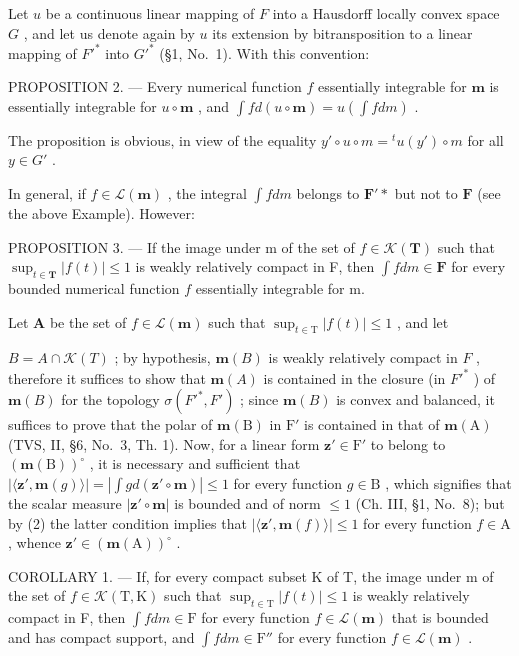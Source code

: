 Let \(u\) be a continuous linear mapping of \(F\) into a Hausdorff locally convex space \(G\) , and let us denote again by \(u\) its extension by bitransposition to a linear mapping of \(F'^*\) into \(G'^*\) (§1, No.~1). With this convention:

PROPOSITION 2. --- Every numerical function \(f\) essentially integrable for \(\mathbf{m}\) is essentially integrable for \(u \circ \mathbf{m}\) , and \(\int f d(u \circ \mathbf{m}) = u\left(\int f dm\right)\) .

The proposition is obvious, in view of the equality \(y'\circ u\circ m = {}^{t}u(y')\circ m\) for all \(y \in G'\) .

In general, if \(f \in \mathcal{L}(\mathbf{m})\) , the integral \(\int f dm\) belongs to \(\mathbf{F}'*\) but not to \(\mathbf{F}\) (see the above Example). However:

PROPOSITION 3. --- If the image under m of the set of \(f \in \mathcal{K}(\mathbf{T})\) such that \(\sup_{t \in \mathbf{T}} |f(t)| \leqslant 1\) is weakly relatively compact in F, then \(\int f dm \in \mathbf{F}\) for every bounded numerical function \(f\) essentially integrable for m.

Let \(\mathbf{A}\) be the set of \(f\in \mathcal{L}(\mathbf{m})\) such that \(\sup_{t\in \mathrm{T}}|f(t)|\leqslant 1\) , and let

\(B = A \cap \mathcal{K}(T)\) ; by hypothesis, \(\mathbf{m}(B)\) is weakly relatively compact in \(F\) , therefore it suffices to show that \(\mathbf{m}(A)\) is contained in the closure (in \(F'^*\) ) of \(\mathbf{m}(B)\) for the topology \(\sigma(F'^*, F')\) ; since \(\mathbf{m}(B)\) is convex and balanced, it suffices to prove that the polar of \(\mathbf{m}(\mathrm{B})\) in \(\mathrm{F}'\) is contained in that of \(\mathbf{m}(\mathrm{A})\) (TVS, II, §6, No.~3, Th. 1). Now, for a linear form \(\mathbf{z}' \in \mathrm{F}'\) to belong to \((\mathbf{m}(\mathrm{B}))^\circ\) , it is necessary and sufficient that \(|\langle \mathbf{z}', \mathbf{m}(g) \rangle| = |\int g d(\mathbf{z}' \circ \mathbf{m})| \leqslant 1\) for every function \(g \in \mathrm{B}\) , which signifies that the scalar measure \(|\mathbf{z}' \circ \mathbf{m}|\) is bounded and of norm \(\leqslant 1\) (Ch. III, §1, No.~8); but by (2) the latter condition implies that \(|\langle \mathbf{z}', \mathbf{m}(f) \rangle| \leqslant 1\) for every function \(f \in \mathrm{A}\) , whence \(\mathbf{z}' \in (\mathbf{m}(\mathrm{A}))^\circ\) .

COROLLARY 1. --- If, for every compact subset K of T, the image under m of the set of \(f \in \mathcal{K}(\mathrm{T},\mathrm{K})\) such that \(\sup_{t \in \mathrm{T}} |f(t)| \leqslant 1\) is weakly relatively compact in F, then \(\int f dm \in \mathrm{F}\) for every function \(f \in \mathcal{L}(\mathbf{m})\) that is bounded and has compact support, and \(\int f dm \in \mathrm{F}''\) for every function \(f \in \mathcal{L}(\mathbf{m})\) .

